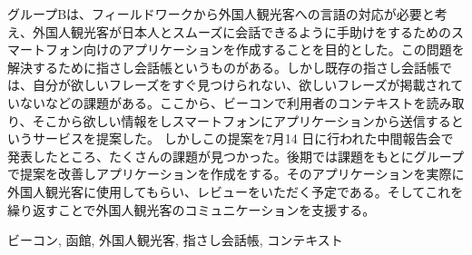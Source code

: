 \documentclass[11pt,papersize]{jsbook}
\begin{document}
%
\maketitle

\frontmatter

\begin{jabstract}



グループBは、フィールドワークから外国人観光客への言語の対応が必要と考え、外国人観光客が日本人とスムーズに会話できるように手助けをするためのスマートフォン向けのアプリケーションを作成することを目的とした。この問題を解決するために指さし会話帳というものがある。しかし既存の指さし会話帳では、自分が欲しいフレーズをすぐ見つけられない、欲しいフレーズが掲載されていないなどの課題がある。ここから、ビーコンで利用者のコンテキストを読み取り、そこから欲しい情報をしスマートフォンにアプリケーションから送信するというサービスを提案した。
しかしこの提案を7月14 日に行われた中間報告会で発表したところ、たくさんの課題が見つかった。後期では課題をもとにグループで提案を改善しアプリケーションを作成をする。そのアプリケーションを実際に外国人観光客に使用してもらい、レビューをいただく予定である。そしてこれを繰り返すことで外国人観光客のコミュニケーションを支援する。

\begin{jkeyword}
  ビーコン, 函館, 外国人観光客, 指さし会話帳, コンテキスト
\end{jkeyword}

\end{jabstract}
\end{document}
